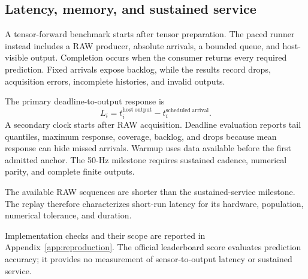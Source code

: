 \subsection{Latency, memory, and sustained service}
A tensor-forward benchmark starts after tensor preparation. The paced runner instead includes a RAW producer, absolute arrivals, a bounded queue, and host-visible output. Completion occurs when the consumer returns every required prediction. Fixed arrivals expose backlog, while the results record drops, acquisition errors, incomplete histories, and invalid outputs. 

The primary deadline-to-output response is
\begin{equation}
 L_i=t_i^{\mathrm{host\ output}}-t_i^{\mathrm{scheduled\ arrival}}.
\end{equation}
A secondary clock starts after RAW acquisition. Deadline evaluation reports tail quantiles, maximum response, coverage, backlog, and drops because mean response can hide missed arrivals. Warmup uses data available before the first admitted anchor. The 50-Hz milestone requires sustained cadence, numerical parity, and complete finite outputs. 

The available RAW sequences are shorter than the sustained-service milestone. The replay therefore characterizes short-run latency for its hardware, population, numerical tolerance, and duration.

Implementation checks and their scope are reported in Appendix~\ref{app:reproduction}.  The official leaderboard score evaluates prediction accuracy; it provides no measurement of sensor-to-output latency or sustained service.
